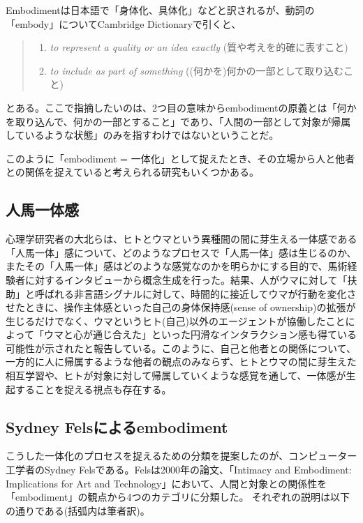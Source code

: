 Embodimentは日本語で「身体化、具体化」などと訳されるが、動詞の「embody」についてCambridge Dictionaryで引くと、
\begin{quote}
  \begin{enumerate}
    \item \textit{to represent a quality or an idea exactly} (質や考えを的確に表すこと) 
    \item \textit{to include as part of something} ((何かを)何かの一部として取り込むこと)
  \end{enumerate}
\end{quote}
とある\cite{embody}。ここで指摘したいのは、2つ目の意味からembodimentの原義とは「何かを取り込んで、何かの一部とすること」であり、「人間の一部として対象が帰属しているような状態」のみを指すわけではないということだ。

このように「embodiment = 一体化」として捉えたとき、その立場から人と他者との関係を捉えていると考えられる研究もいくつかある。

\subsection{人馬一体感}
心理学研究者の大北らは、ヒトとウマという異種間の間に芽生える一体感である「人馬一体」感について、どのようなプロセスで「人馬一体」感は生じるのか、またその「人馬一体」感はどのような感覚なのかを明らかにする目的で、馬術経験者に対するインタビューから概念生成を行った\cite{ohkita2018}。結果、人がウマに対して「扶助」と呼ばれる非言語シグナルに対して、時間的に接近してウマが行動を変化させたときに、操作主体感といった自己の身体保持感(sense of ownership)の拡張が生じるだけでなく、ウマというヒト(自己)以外のエージェントが協働したことによって「ウマと心が通じ合えた」といった円滑なインタラクション感も得ている可能性が示されたと報告している。このように、自己と他者との関係について、一方的に人に帰属するような他者の観点のみならず、ヒトとウマの間に芽生えた相互学習や、ヒトが対象に対して帰属していくような感覚を通して、一体感が生起することを捉える視点も存在する。

\subsection{Sydney Felsによるembodiment}
こうした一体化のプロセスを捉えるための分類を提案したのが、コンピューター工学者のSydney Felsである。Felsは2000年の論文、「Intimacy and Embodiment: Implications for Art and Technology」\cite{Fels}において、人間と対象との関係性を「embodiment」の観点から4つのカテゴリに分類した。
それぞれの説明は以下の通りである(括弧内は筆者訳)。

